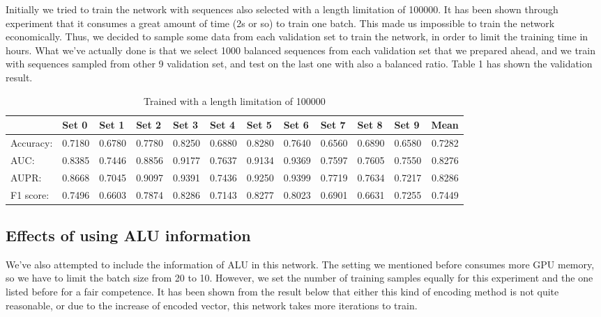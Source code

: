 \documentclass[10pt,a4paper]{article}
\begin{document}
\begin{spacing}{1.5}
		Initially we tried to train the network with sequences also selected with a length limitation of 100000. It has been shown through experiment that it consumes a great amount of time (2s or so) to train one batch. This made us impossible to train the network economically. Thus, we decided to sample some data from each validation set to train the network, in order to limit the training time in hours. What we've actually done is that we select 1000 balanced sequences from each validation set that we prepared ahead, and we train with sequences sampled from other 9 validation set, and test on the last one with also a balanced ratio. Table 1 has shown the validation result.
		\begin{table}[H]
			\centering
			\caption{Trained with a length limitation of 100000}
			\begin{tabular}{l|rrrrrrrrrr|r}
				& \multicolumn{1}{l}{Set 0} & \multicolumn{1}{l}{Set 1} & \multicolumn{1}{l}{Set 2} & \multicolumn{1}{l}{Set 3} & \multicolumn{1}{l}{Set 4} & \multicolumn{1}{l}{Set 5} & \multicolumn{1}{l}{Set 6} & \multicolumn{1}{l}{Set 7} & \multicolumn{1}{l}{Set 8} & \multicolumn{1}{l}{Set 9} & \multicolumn{1}{l}{Mean} \\ \hline \hline
				Accuracy: & 0.7180  & 0.6780  & 0.7780  & 0.8250  & 0.6880  & 0.8280  & 0.7640  & 0.6560  & 0.6890  & 0.6580  & 0.7282  \\
				AUC:  & 0.8385  & 0.7446  & 0.8856  & 0.9177  & 0.7637  & 0.9134  & 0.9369  & 0.7597  & 0.7605  & 0.7550  & 0.8276  \\
				AUPR: & 0.8668  & 0.7045  & 0.9097  & 0.9391  & 0.7436  & 0.9250  & 0.9399  & 0.7719  & 0.7634  & 0.7217  & 0.8286  \\
				F1 score: & 0.7496  & 0.6603  & 0.7874  & 0.8286  & 0.7143  & 0.8277  & 0.8023  & 0.6901  & 0.6631  & 0.7255  & 0.7449  \\
			\end{tabular}%
			\label{tab:addlabel}%
		\end{table}%
		
		\subsection{Effects of using ALU information}
		
		We've also attempted to include the information of ALU in this network. The setting we mentioned before consumes more GPU memory, so we have to limit the batch size from 20 to 10. However, we set the number of training samples equally for this experiment and the one listed before for a fair competence. It has been shown from the result below that either this kind of encoding method is not quite reasonable, or due to the increase of encoded vector, this network takes more iterations to train.
		

\end{spacing}
\end{document}
